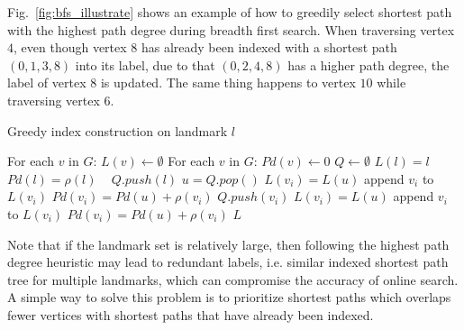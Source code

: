 Fig.~\ref{fig:bfs_illustrate} shows an example of how to greedily select shortest path with the highest path degree during breadth first search. When traversing vertex $4$, even though vertex $8$ has already been indexed with a shortest path $(0, 1, 3, 8)$ into its label, due to that $(0, 2, 4, 8)$ has a higher path degree, the label of vertex $8$ is updated. The same thing happens to vertex $10$ while traversing vertex $6$. 

\begin{algorithm}[h]
    \caption{Greedy index construction on landmark $l$}
		\label{alg:ind}
    \begin{algorithmic}
						\State For each $v$ in $G$: $L(v) \gets \emptyset$
						\State For each $v$ in $G$: $Pd(v) \gets 0$
						\State $Q \gets \emptyset$
						\State $L(l) = l$
						\State $Pd(l) = \rho(l)$ \
						\State $Q.push(l)$
								\State $u = Q.pop()$
												\State $L(v_i) = L(u)$
												\State append $v_i$ to $L(v_i)$
												\State $Pd(v_i) = Pd(u) + \rho(v_i)$
												\State $Q.push(v_i)$
												\State $L(v_i) = L(u)$
												\State append $v_i$ to $L(v_i)$
												\State $Pd(v_i) = Pd(u) + \rho(v_i)$
										\EndIf
								\EndFor
						\EndWhile
						\State \Return $L$
        \EndFunction
    \end{algorithmic}
\end{algorithm}

Note that if the landmark set is relatively large, then following the highest path degree heuristic may lead to redundant labels, i.e. similar indexed shortest path tree for multiple landmarks, which can compromise the accuracy of online search. A simple way to solve this problem is to prioritize shortest paths which overlaps fewer vertices with shortest paths that have already been indexed.